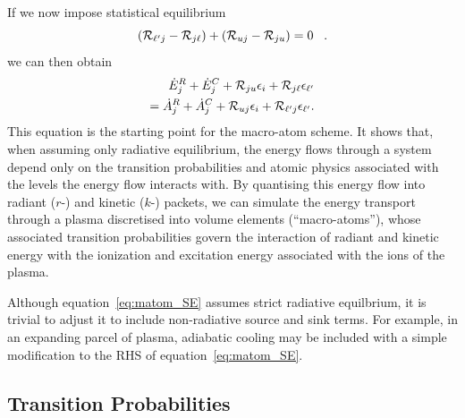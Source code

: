 If we now impose statistical equilibrium
%
\begin{equation}
 ({\cal R}_{\ell^\prime j}-{\cal R}_{j \ell})+({\cal R}_{uj}-{\cal R}_{ju})=0 \;\;\;.
\end{equation}
we can then obtain 
\begin{eqnarray}
 \dot{E}_{j}^{R}+\dot{E}_{j}^{C}+{\cal R}_{ju}\epsilon_{i}+
 {\cal R}_{j \ell}\epsilon_{\ell^\prime}  \nonumber \\  
 = \dot{A}_{j}^{R}+\dot{A}_{j}^{C}+{\cal R}_{uj} \epsilon_{i}
 +{\cal R}_{\ell^\prime j} \epsilon_{\ell^\prime}           .  
 \label{eq:matom_SE}     
\end{eqnarray}
This equation is the starting point for the macro-atom scheme. It shows 
that, when assuming only radiative equilibrium, the energy flows through
a system depend only on the transition probabilities and atomic physics
associated with the levels the energy flow interacts with.
By quantising this energy flow into radiant ($r$-) and kinetic ($k$-) packets, 
we can simulate the energy transport through
a plasma discretised into volume elements (``macro-atoms''),
whose associated transition probabilities govern the interaction 
of radiant and kinetic energy with the ionization and excitation energy associated 
with the ions of the plasma.

Although equation~\ref{eq:matom_SE} assumes strict radiative equilbrium,
it is trivial to adjust it to include non-radiative source and sink terms. 
For example, in an expanding parcel of plasma, adiabatic cooling may be 
included with a simple modification to the RHS of equation~\ref{eq:matom_SE}.

\subsection{Transition Probabilities}

